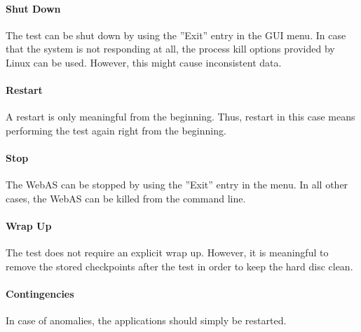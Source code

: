 \paragraph{Shut Down}
The test can be shut down by using the ''Exit'' entry in the GUI menu. In case that the system is not responding at all, the process kill options provided by Linux can be used. However, this might cause inconsistent data.

\paragraph{Restart}
A restart is only meaningful from the beginning. Thus, restart in this case means performing the test again right from the beginning.

\paragraph{Stop}
The WebAS can be stopped by using the ''Exit'' entry in the menu. In all other cases, the WebAS can be killed from the command line.

\paragraph{Wrap Up}
The test does not require an explicit wrap up. However, it is meaningful to remove the stored checkpoints after the test in order to keep the hard disc clean.

\paragraph{Contingencies}
In case of anomalies, the applications should simply be restarted.